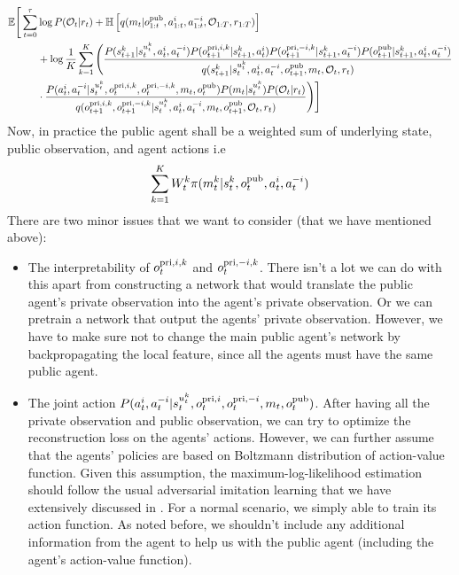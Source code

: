\begin{equation}
\begin{aligned}
\label{eqn:chap5-elbo-public-agent}
    \mathbb{E}\Bigg[\sum^\tau_{t=0} &\log P(\mathcal{O}_t | r_t) + \mathbb{H}\left[ q(m_t | o^{\operatorname{pub}}_{1:t}, a^{i}_{1:t}, a^{-i}_{1:t}, \mathcal{O}_{1:T}, r_{1:T}) \right] \\
    &+ \log \frac{1}{K} \sum ^K_{k=1}\Bigg(\frac{P(s_{t+1}^k | s_t^{u^k_t}, a_t^i, a_t^{-i})P(o^{\operatorname{pri}, i, k}_{t+1} | s_{t+1}^k, a^i_t) P(o^{\operatorname{pri}, -i, k}_{t+1} | s_{t+1}^k, a^{-i}_t) P(o^{\operatorname{pub}}_{t+1} | s_{t+1}^k, a^i_t, a^{-i}_t)}{q(s_{t+1}^k | s_t^{u^k_t}, a^i_t, a^{-i}_t, o^{\operatorname{pub}}_{t+1}, m_t, \mathcal{O}_t, r_t)} \\
    &\cdot \frac{P(a^i_t, a^{-i}_t | s_t^{u^k_t}, o^{\operatorname{pri}, i, k}_t, o^{\operatorname{pri}, -i, k}_t, m_t, o^{\operatorname{pub}}_t) P(m_t | s_t^{u^k_t}) P(\mathcal{O}_t | r_t)}{q(o^{\operatorname{pri}, i, k}_{t+1}, o^{\operatorname{pri}, -i, k}_{t+1} | s_t^{u^k_t}, a^i_t, a^{-i}_t, m_t, o^{\operatorname{pub}}_{t+1}, \mathcal{O}_t, r_t)} \Bigg)\Bigg]
\end{aligned}
\end{equation}
Now, in practice the public agent shall be a weighted sum of underlying state, public observation, and agent actions i.e
\begin{equation}
    \sum^K_{k=1} W^k_t \pi(m^k_t | s^k_t, o^{\operatorname{pub}}_t, a^i_t, a^{-i}_t)
\end{equation}
There are two minor issues that we want to consider (that we have mentioned above):
\begin{itemize}
    \item The interpretability of $o^{\operatorname{pri}, i, k}_t$ and $o^{\operatorname{pri}, -i, k}_t$. There isn't a lot we can do with this apart from constructing a network that would translate the public agent's private observation into the agent's private observation. Or we can pretrain a network that output the agents' private observation. However, we have to make sure not to change the main public agent's network by backpropagating the local feature, since all the agents must have the same public agent.
    \item The joint action $P(a^i_t, a^{-i}_t | s_t^{u^k_t}, o^{\operatorname{pri}, i}_t, o^{\operatorname{pri}, -i}_t, m_t, o^{\operatorname{pub}}_t)$. After having all the private observation and public observation, we can try to optimize the reconstruction loss on the agents' actions. However, we can further assume that the agents' policies are based on Boltzmann distribution of action-value function. Given this assumption, the maximum-log-likelihood estimation should follow the usual adversarial imitation learning that we have extensively discussed in \cite{finn2016connection, yu2019multi}. For a normal scenario, we simply able to train its action function. As noted before, we shouldn't include any additional information from the agent to help us with the public agent (including the agent's action-value function). 
\end{itemize}
